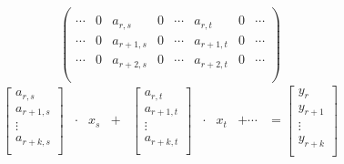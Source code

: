       \begin{figure}[ht]
        \centering
        $$
        \begin{pmatrix}
          \\
          \cdots & 0 & a_{r,s} &  0 & \cdots & a_{r,t} & 0 & \cdots \\
          \cdots & 0 & a_{r+1,s} & 0 & \cdots & a_{r+1,t} & 0 & \cdots \\
          \cdots & 0 & a_{r+2,s} & 0 & \cdots & a_{r+2,t} & 0 & \cdots \\
          \\
        \end{pmatrix}
        $$
        $$
        \begin{matrix}
          \begin{bmatrix}
            a_{r,s}     \\
            a_{r+1,s} \\
               \vdots   \\
            a_{r+k,s} \\
          \end{bmatrix} & \cdot & x_s & + & \begin{bmatrix}
                                              a_{r,t}     \\
                                              a_{r+1,t} \\
                                                \vdots    \\
                                              a_{r+k,t} \\
                                            \end{bmatrix} & \cdot & x_t & + \cdots & = \begin{bmatrix}
                                                                                       y_{r}   \\
                                                                                       y_{r+1} \\
                                                                                       \vdots  \\
                                                                                       y_{r+k} \\

\end{bmatrix}
\end{matrix}$$
\end{figure}
